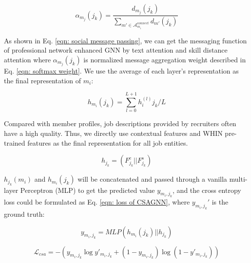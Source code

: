 \begin{equation}
    \label{eqn: softmax weight}
    \alpha_{m_j}(j_k) = \frac{d_{m_j}(j_k)}{\sum_{m'\in \mathcal{A}_{m_i}^{connect}}{d_{m'}(j_k)}}
\end{equation}



As shown in Eq. \ref{eqn: social message passing}, we can get the messaging function of professional network enhanced GNN by text attention and skill distance attention where $\alpha_{m_j}(j_k)$ is normalized message aggregation weight described in Eq. \ref{eqn: softmax weight}. We use the average of each layer's representation as the final representation of $m_i$:

\begin{equation}
\label{eqn: residual sum}
    h_{m_i}(j_k) = \sum_{l=0}^{L+1}{h_i^{(l)}{j_k}}/L
\end{equation}

Compared with member profiles, job descriptions provided by recruiters often have a high quality. Thus, we directly use contextual features and WHIN pre-trained features as the final representation for all job entities.

\begin{equation}
\label{eqn: job init representation}
    h_{j_k} = (F_{j_k}^c || F_{j_k}^s)
\end{equation}

$h_{j_k}(m_i)$ and $h_{m_i}(j_k)$ will be concatenated and passed through a vanilla multi-layer Perceptron (MLP) to get the predicted value $y_{m_i, j_k}$, and the cross entropy loss could be formulated as Eq. \ref{eqn: loss of CSAGNN}, where $y_{m_i,j_k}'$ is the ground truth:

\begin{equation}
    y_{m_i, j_k} = MLP(h_{m_i}(j_k)||h_{j_k})
\end{equation}

\begin{equation}
    \label{eqn: loss of CSAGNN}
    \mathcal{L}_{csa}= -\left(y_{m_i, j_k}\log y'_{m_i, j_k} + \left(1-y_{m_i, j_k}\right)\log\left(1-y'_{m_i, j_k}\right)\right)
\end{equation}
